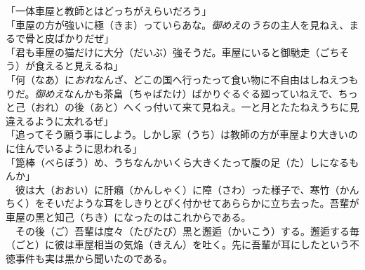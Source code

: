 \documentclass{book}
\begin{document}
「一体車屋と教師とはどっちがえらいだろう」\\
「車屋の方が強いに極（きま）っていらあな。\emph{御めえ}の\emph{うち}の主人を見ねえ、まるで骨と皮ばかりだぜ」\\
「君も車屋の猫だけに大分（だいぶ）強そうだ。車屋にいると御馳走（ごちそう）が食えると見えるね」\\
「何（なあ）に\emph{おれ}なんざ、どこの国へ行ったって食い物に不自由はしねえつもりだ。\emph{御めえ}なんかも茶畠（ちゃばたけ）ばかりぐるぐる廻っていねえで、ちっと己（おれ）の後（あと）へくっ付いて来て見ねえ。一と月とたたねえうちに見違えるように太れるぜ」\\
「追ってそう願う事にしよう。しかし家（うち）は教師の方が車屋より大きいのに住んでいるように思われる」\\
「箆棒（べらぼう）め、うちなんかいくら大きくたって腹の足（た）しになるもんか」\\
　彼は大（おおい）に肝癪（かんしゃく）に障（さわ）った様子で、寒竹（かんちく）をそいだような耳をしきりとぴく付かせてあららかに立ち去った。吾輩が車屋の黒と知己（ちき）になったのはこれからである。\\
　その後（ご）吾輩は度々（たびたび）黒と邂逅（かいこう）する。邂逅する毎（ごと）に彼は車屋相当の気焔（きえん）を吐く。先に吾輩が耳にしたという不徳事件も実は黒から聞いたのである。\\
\end{document}

